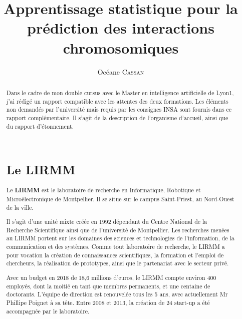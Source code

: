 \documentclass[french]{llncs}
\title{Apprentissage statistique pour la prédiction des interactions chromosomiques}
\author{ Océane \textsc{Cassan} 
\newline{}{Encadrée par Laurent \textsc{Bréhélin}, Charles-Henri \textsc{Lecellier}, Sophie \textsc{Lèbre}}}
\institute{INSA de Lyon}
\begin{document}
\clearpage\thispagestyle{empty}\addtocounter{page}{-1} 

    \renewcommand{\thelstlisting}{\arabic{lstlisting}}

    \maketitle

    \vfill
    \begin{abstract} Dans le cadre de mon double cursus avec le Master en intelligence artificielle de Lyon1, j'ai rédigé un rapport compatible avec les attentes des deux formations. Les éléments non demandés par l'université mais requis par les consignes INSA sont fournis dans ce rapport complémentaire. Il s'agit de la description de l'organisme d'accueil, ainsi que du rapport d'étonnement. 
    
\\
    \vfill

\clearpage
   



\clearpage\thispagestyle{empty}\addtocounter{page}{-1} 

\section{Le LIRMM}

Le \textbf{LIRMM} est le laboratoire de recherche en Informatique, Robotique et Microélectronique de Montpellier. Il se situe sur le campus Saint-Priest, au Nord-Ouest de la ville.

Il s'agit d'une unité mixte créée en 1992 dépendant du Centre National de la Recherche Scientifique ainsi que de l'université de Montpellier. Les recherches menées au LIRMM portent sur les domaines des sciences et technologies de l’information, de la communication et des systèmes.
Comme tout laboratoire de recherche, le LIRMM a pour vocation la création de connaissances scientifiques, la formation et l'emploi de chercheurs, la réalisation de prototypes, ainsi que le partenariat avec le secteur privé.

Avec un budget en 2018 de 18,6 millions d'euros, le LIRMM compte environ 400 employés, dont la moitié en tant que membres permanents, et une centaine de doctorants. L'équipe de direction est renouvelée tous les 5 ans, avec actuellement Mr Phillipe Poignet à sa tête.
Entre 2008 et 2013, la création de 24 start-up a été accompagnée par le laboratoire.


\end{abstract}
\end{document}
